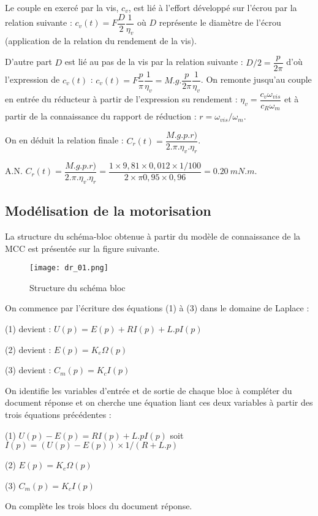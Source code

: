 \ifprof
\begin{corrige}%
Le couple en exercé par la vis, $c_v$, est lié à l’effort développé sur l’écrou par la relation suivante : $c_v (t)=F\dfrac{D}{2}\dfrac{1}{\eta_v}$ où $D$ représente le diamètre de l’écrou (application de la relation du rendement de la vis). 

D’autre part $D$ est lié au pas de la vis par la relation suivante : $D/2=\dfrac{p}{2\pi}$ 
d’où l’expression de $c_v(t)$ : $c_v (t)=F \dfrac{p}{\pi}\dfrac{1}{\eta_v}=M.g.\dfrac{p}{2\pi}\dfrac{1}{\eta_v}$.
On remonte jusqu’au couple en entrée du réducteur à partir de l’expression su rendement : $\eta_v= \dfrac{c_v \omega_{vis}}{c_R \omega_m}$ et à partir de la connaissance du rapport de réduction : $r=\omega_{vis}/\omega_m$.
 
On en déduit la relation finale : $C_r (t)=\dfrac{M.g.p.r)}{2.\pi.\eta_v.\eta_r}$.

A.N. $C_r (t)=\dfrac{M.g.p.r)}{2.\pi.\eta_v.\eta_r}=\dfrac{1 \times  9,81 \times  0,012\times  1/100}{2 \times  \pi 0,95\times 0,96}=\SI{0,20}{mN.m}$.

\end{corrige}
\else
\fi

\subsection*{Modélisation de la motorisation}
\ifprof
\else
La structure du schéma-bloc obtenue à partir du modèle de connaissance de la MCC est présentée sur la figure suivante.

\begin{figure}[!h]
\centering
\texttt{[image: dr\_01.png]}
\caption{Structure du schéma bloc \label{dr_01}}
\end{figure}
\fi

\ifprof
\begin{corrige}%
On commence par l’écriture des équations (1) à (3) dans le domaine de Laplace :

(1) devient : $U(p)=E(p)+R I(p)+L.p I(p)$

(2) devient : $E(p)=K_e \Omega(p)$

(3) devient : $C_m (p)=K_c I(p)$

On identifie les variables d’entrée et de sortie de chaque bloc à compléter du document réponse et on cherche une équation liant ces deux variables à partir des trois équations précédentes :

(1) $U(p)-E(p)=RI(p)+L.pI(p)$ soit $I(p)=(U(p)-E(p))\times 1/(R+L.p)$

(2) $E(p)=K_e \Omega(p)$ 

(3) $C_m (p)=K_c I(p)$

On complète les trois blocs du document réponse.

\end{corrige}
\else
\fi

